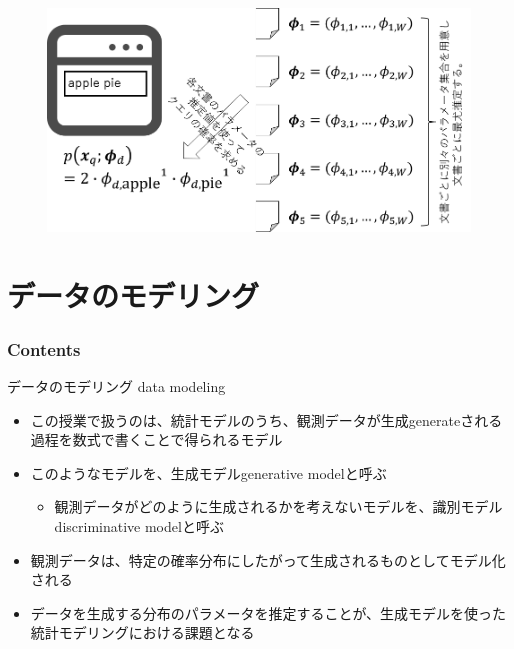 \documentclass[aspectratio=169,unicode,dvipdfmx,14pt]{beamer}
\begin{document}
\begin{frame}
\begin{figure}[htbp]
\begin{center}
\includegraphics[scale=0.42]{information_retrieval.png}
\label{}
\end{center}
\end{figure}
\end{frame}

\section{データのモデリング}

\begin{frame}\frametitle{Contents}
\Large \tableofcontents[currentsection]
\end{frame}

\begin{frame}{データのモデリング data modeling}
\begin{itemize}
\item この授業で扱うのは、統計モデルのうち、観測データが生成generateされる過程を数式で書くことで得られるモデル
\item このようなモデルを、生成モデルgenerative modelと呼ぶ
\begin{itemize}
\item 観測データがどのように生成されるかを考えないモデルを、識別モデルdiscriminative modelと呼ぶ
\end{itemize}
\item 観測データは、特定の確率分布にしたがって生成されるものとしてモデル化される
\item データを生成する分布のパラメータを推定することが、生成モデルを使った統計モデリングにおける課題となる
\end{itemize}
\end{frame}
\end{document}
